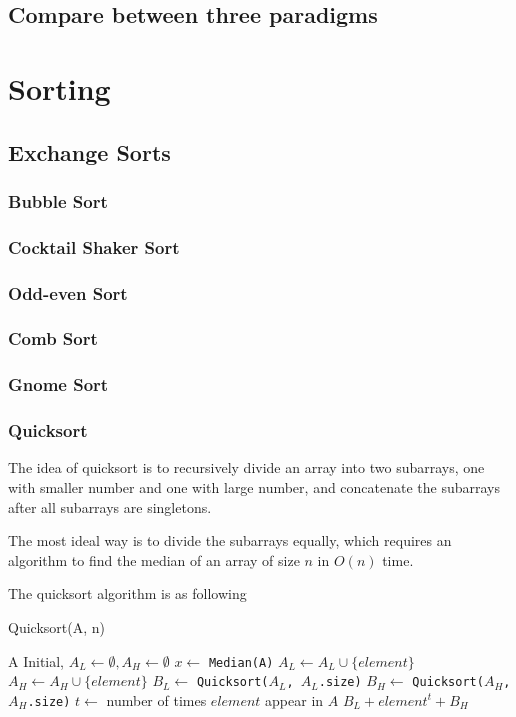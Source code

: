 			\section{Compare between three paradigms}

		\chapter{Sorting}
			\section{Exchange Sorts}
				\subsection{Bubble Sort}

				\subsection{Cocktail Shaker Sort}

				\subsection{Odd-even Sort}

				\subsection{Comb Sort}

				\subsection{Gnome Sort}

				\subsection{Quicksort}
					The idea of quicksort is to recursively divide an array into two subarrays, one with smaller number and one with large number, and concatenate  the subarrays after all subarrays are singletons.

					The most ideal way is to divide the subarrays equally, which requires an algorithm to find the median of an array of size $n$ in $O(n)$ time.

					The quicksort algorithm is as following
					\begin{algorithm}[h]
						\caption{Quicksort(A, n)}
						\begin{algorithmic}[1]
								\Return A
							\EndIf
							\State Initial, $A_L \gets \emptyset, A_H \gets \emptyset$
							\State $x \gets$ \texttt{Median(A)}
									\State $A_L \gets A_L \cup \{element\}$
								\Else
									\State $A_H \gets A_H \cup \{element\}$
								\EndIf
							\EndFor
							\State $B_L \gets$ \texttt{Quicksort($A_L$, $A_L$.size)}
							\State $B_H \gets$ \texttt{Quicksort($A_H$, $A_H$.size)}
							\State $t \gets$ number of times $element$ appear in $A$
							\Return $B_L + element^t + B_H$
						\end{algorithmic}
					\end{algorithm}


